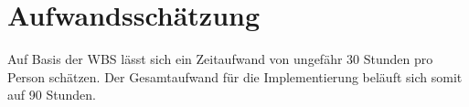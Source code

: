 \section{Aufwandsschätzung}

Auf Basis der WBS lässt sich ein Zeitaufwand von ungefähr 30 Stunden pro Person schätzen.
Der Gesamtaufwand für die Implementierung beläuft sich somit auf 90 Stunden.
